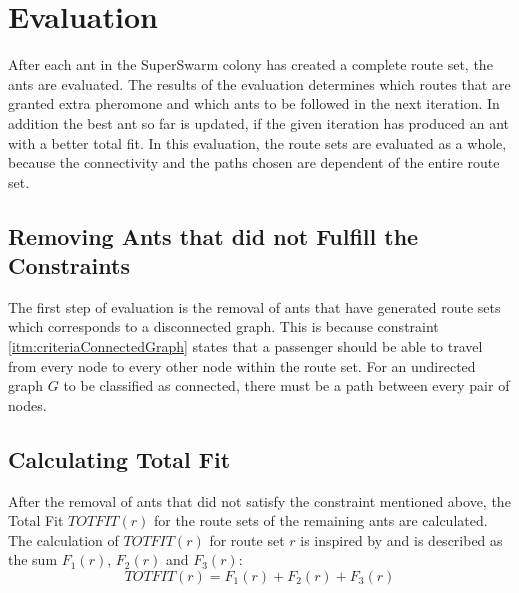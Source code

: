 \section{Evaluation}
\label{sec:algoEvaluation}
After each ant in the SuperSwarm colony has created a complete route set, the ants are evaluated. The results of the evaluation determines which routes that are granted extra pheromone and which ants to be followed in the next iteration. In addition the best ant so far is updated, if the given iteration has produced an ant with a better total fit. In this evaluation, the route sets are evaluated as a whole, because the connectivity and the paths chosen are dependent of the entire route set. 

\subsection{Removing Ants that did not Fulfill the Constraints}
\label{sec:algoRemoval}
The first step of evaluation is the removal of ants that have generated route sets which corresponds to a disconnected graph. This is because constraint \vref{itm:criteriaConnectedGraph} states that a passenger should be able to travel from every node to every other node within the route set. For an undirected graph $G$ to be classified as connected, there must be a path between every pair of nodes. 

\subsection{Calculating Total Fit}
\label{sec:totfit}
After the removal of ants that did not satisfy the constraint mentioned above, the Total Fit $TOTFIT(r)$ for the route sets of the remaining ants are calculated. The calculation of $TOTFIT(r)$ for route set $r$ is inspired by \citet{kechagiopoulos14} and is described as the sum $F_{1}(r)$, $F_{2}(r)$ and $F_{3}(r)$: 
\newline
$$ TOTFIT(r) = F_{1}(r) + F_{2}(r) + F_{3}(r)$$
